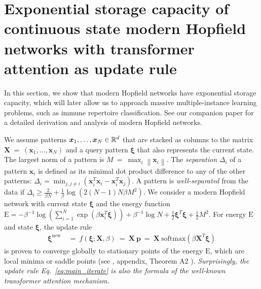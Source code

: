 \documentclass[oneside]{book}
\newcommand\Bp{\bm{p}}
\newcommand\Bx{\bm{x}}
\newcommand\BX{\bm{X}}
\newcommand\Bxi{\bm{\xi}}
\newcommand{\rE}{\mathrm{E}} \newcommand{\rF}{\mathrm{F}}
\newcommand\nn{\mathrm{new}}
\newcommand{\NRM}[1]{{{\left\| #1\right\|}}} %
\newcommand{\soft}{\mathrm{softmax}}
\begin{document}
%

\vspace{\cheatspace}
\section*{Exponential storage capacity of continuous state modern Hopfield networks with
transformer attention as update rule}
\label{sec:theory}
\vspace{\cheatspace}
In this section,
we show that modern Hopfield networks have exponential storage 
capacity, which will later allow us to approach 
massive multiple-instance learning problems, such as immune repertoire classification.
See our companion paper \citep{Ramsauer:20} for a detailed derivation and analysis of
modern Hopfield networks. 
%

%
We assume patterns $\Bx_1,\ldots,\Bx_N \in \dR^d$
that are stacked as columns to 
the matrix $\BX \ = \ \left( \Bx_1,\ldots,\Bx_N \right)$ and a 
query pattern $\Bxi$ that also represents the current state. 
The largest norm of a pattern is
$M \ = \ \max_{i} \NRM{\Bx_i}$. The \emph{separation} $\Delta_i$  of a 
pattern $\Bx_i$ is defined as its minimal dot product difference to any of the other 
patterns:
%
$\Delta_i = \min_{j,j \not= i} \left( \Bx_i^T \Bx_i - \Bx_i^T \Bx_j \right)$. 
%
A pattern is \emph{well-separated} from the data if $
 \Delta_i  \geq \frac{2}{\beta N} + \frac{1}{\beta} \log \left( 2 (N-1)  N  \beta  M^2 \right)$.
%
We consider a modern Hopfield network with current state $\Bxi$
and the energy function 
$\rE  =   -  \beta^{-1} \log \left( \sum_{i=1}^N
\exp(\beta \Bx_i^T \Bxi) \right)   +  \beta^{-1} \log N  + 
\frac{1}{2} \Bxi^T \Bxi  +  \frac{1}{2} M^2$. 
For energy $\rE$ and state $\Bxi$, the update rule
\begin{align}
\label{eq:main_iterate}
\Bxi^{\nn} \ &= \ f(\Bxi;\BX,\beta) \ = \ \BX \ \Bp \ = \   \BX \ \soft ( \beta \BX^T \Bxi)
\end{align}
is proven to converge globally  
to stationary points of the energy $\rE$, which are local minima or saddle points
(see \citep{Ramsauer:20}, appendix, Theorem A2 ). %
{\em Surprisingly, the update rule Eq.~\eqref{eq:main_iterate}
is also the formula of the well-known transformer attention mechanism.}
\end{document}
